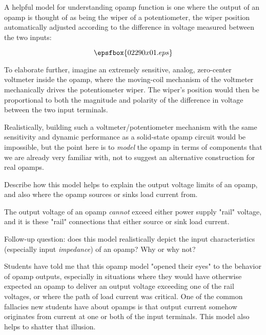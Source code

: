 

A helpful model for understanding opamp function is one where the output of an opamp is thought of as being the wiper of a potentiometer, the wiper position automatically adjusted according to the difference in voltage measured between the two inputs:

$$\epsfbox{02290x01.eps}$$

To elaborate further, imagine an extremely sensitive, analog, zero-center voltmeter inside the opamp, where the moving-coil mechanism of the voltmeter mechanically drives the potentiometer wiper.  The wiper's position would then be proportional to both the magnitude and polarity of the difference in voltage between the two input terminals.  

Realistically, building such a voltmeter/potentiometer mechanism with the same sensitivity and dynamic performance as a solid-state opamp circuit would be impossible, but the point here is to {\it model} the opamp in terms of components that we are already very familiar with, not to suggest an alternative construction for real opamps.

\vskip 10pt

Describe how this model helps to explain the output voltage limits of an opamp, and also where the opamp sources or sinks load current from.







The output voltage of an opamp {\it cannot} exceed either power supply "rail" voltage, and it is these "rail" connections that either source or sink load current.

\vskip 10pt

Follow-up question: does this model realistically depict the input characteristics (especially input {\it impedance}) of an opamp?  Why or why not?







Students have told me that this opamp model "opened their eyes" to the behavior of opamp outputs, especially in situations where they would have otherwise expected an opamp to deliver an output voltage exceeding one of the rail voltages, or where the path of load current was critical.  One of the common fallacies new students have about opamps is that output current somehow originates from current at one or both of the input terminals.  This model also helps to shatter that illusion.


